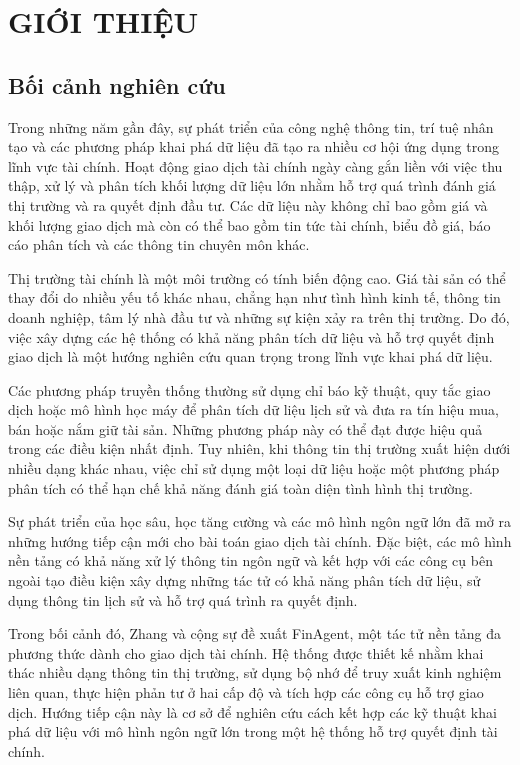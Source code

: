 
\chapter{GIỚI THIỆU}

\section{Bối cảnh nghiên cứu}

Trong những năm gần đây, sự phát triển của công nghệ thông tin, trí tuệ nhân tạo và các phương pháp khai phá dữ liệu đã tạo ra nhiều cơ hội ứng dụng trong lĩnh vực tài chính. Hoạt động giao dịch tài chính ngày càng gắn liền với việc thu thập, xử lý và phân tích khối lượng dữ liệu lớn nhằm hỗ trợ quá trình đánh giá thị trường và ra quyết định đầu tư. Các dữ liệu này không chỉ bao gồm giá và khối lượng giao dịch mà còn có thể bao gồm tin tức tài chính, biểu đồ giá, báo cáo phân tích và các thông tin chuyên môn khác.

Thị trường tài chính là một môi trường có tính biến động cao. Giá tài sản có thể thay đổi do nhiều yếu tố khác nhau, chẳng hạn như tình hình kinh tế, thông tin doanh nghiệp, tâm lý nhà đầu tư và những sự kiện xảy ra trên thị trường. Do đó, việc xây dựng các hệ thống có khả năng phân tích dữ liệu và hỗ trợ quyết định giao dịch là một hướng nghiên cứu quan trọng trong lĩnh vực khai phá dữ liệu.

Các phương pháp truyền thống thường sử dụng chỉ báo kỹ thuật, quy tắc giao dịch hoặc mô hình học máy để phân tích dữ liệu lịch sử và đưa ra tín hiệu mua, bán hoặc nắm giữ tài sản. Những phương pháp này có thể đạt được hiệu quả trong các điều kiện nhất định. Tuy nhiên, khi thông tin thị trường xuất hiện dưới nhiều dạng khác nhau, việc chỉ sử dụng một loại dữ liệu hoặc một phương pháp phân tích có thể hạn chế khả năng đánh giá toàn diện tình hình thị trường.

Sự phát triển của học sâu, học tăng cường và các mô hình ngôn ngữ lớn đã mở ra những hướng tiếp cận mới cho bài toán giao dịch tài chính. Đặc biệt, các mô hình nền tảng có khả năng xử lý thông tin ngôn ngữ và kết hợp với các công cụ bên ngoài tạo điều kiện xây dựng những tác tử có khả năng phân tích dữ liệu, sử dụng thông tin lịch sử và hỗ trợ quá trình ra quyết định.

Trong bối cảnh đó, Zhang và cộng sự \cite{zhang2024finagent} đề xuất FinAgent, một tác tử nền tảng đa phương thức dành cho giao dịch tài chính. Hệ thống được thiết kế nhằm khai thác nhiều dạng thông tin thị trường, sử dụng bộ nhớ để truy xuất kinh nghiệm liên quan, thực hiện phản tư ở hai cấp độ và tích hợp các công cụ hỗ trợ giao dịch. Hướng tiếp cận này là cơ sở để nghiên cứu cách kết hợp các kỹ thuật khai phá dữ liệu với mô hình ngôn ngữ lớn trong một hệ thống hỗ trợ quyết định tài chính.

